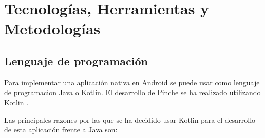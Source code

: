 \cleardoublepage
\chapter{Tecnologías, Herramientas y Metodologías}




\section{Lenguaje de programación}

Para implementar una aplicación nativa en Android se puede usar como lenguaje de programacion Java o Kotlin.
El desarrollo de Pinche se ha realizado utilizando Kotlin \cite{kotlin}.

Las principales razones por las que se ha decidido usar Kotlin para el desarrollo de esta aplicación frente a Java son:

